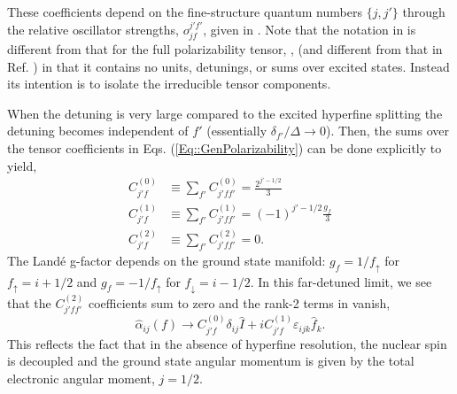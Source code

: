 \documentclass[]{report}
\begin{document}
These coefficients depend on the fine-structure quantum numbers $\{j, j'\}$ through the relative oscillator strengths, $o^{j' f'}_{j f}$, given in .  Note that the notation in  is different from that for the full polarizability tensor, , (and different from that in Ref. \cite{Deutsch2010a}) in that it contains no units, detunings, or sums over excited states.  Instead its intention is to isolate the irreducible tensor components.   

When the detuning is very large compared to the excited hyperfine splitting the detuning becomes independent of $f'$ (essentially $\delta_{f'}/\Delta \rightarrow 0$).  Then, the sums over the tensor coefficients in Eqs. (\ref{Eq::GenPolarizability}) can be done explicitly to yield,
	\begin{align}
		C_{j' f}^{(0)} &\equiv \sum_{f'} C_{j' f f'}^{(0)} =   \frac{2^{j'-1/2}}{3} \label{Eq::ScalarCoefSum} \\ 
		C_{j' f}^{(1)} &\equiv  \sum_{f'} C_{j' f f'}^{(1)} = (-1)^{j'-1/2} \frac{g_f}{3} \\
		C_{j' f}^{(2)} &\equiv  \sum_{f'} C_{j' f f'}^{(2)} = 0. \label{Eq::Rank2Sum}
	\end{align}
The Land\'{e} g-factor depends on the ground state manifold:  $g_f = 1/f_{\uparrow}$ for $f_{\uparrow} = i + 1/2$ and $g_f = -1/f_{\uparrow}$ for $f_{\downarrow} = i - 1/2$.  In this far-detuned limit, we see that the $C_{j' f f'}^{(2)}$ coefficients sum to zero and the rank-2 terms in  vanish,
	\begin{equation} \label{Eq::GenPolarizability}
		\hat{\alpha}_{ij} (f) \rightarrow  C_{j' f}^{(0)} \delta_{ij} \hat{ I } + i C_{j' f }^{(1)} \varepsilon_{ijk} \hat{f}_k  .
	\end{equation}
This reflects the fact that in the absence of hyperfine resolution, the nuclear spin is decoupled and the ground state angular momentum is given by the total electronic angular moment, $j=1/2$. 
\end{document}
